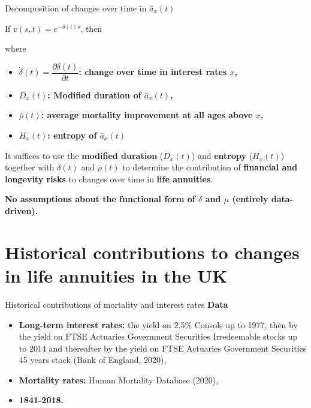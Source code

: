 \documentclass[10pt]{beamer}
\begin{document}
\begin{frame}{Decomposition of changes over time in $\bar{a}_x(t)$}


If $v(s,t)=e^{-\delta(t)s}$, then 


\begin{center}
	\pause
\end{center}

where

\begin{itemize}
	
	\item $\dot{\delta}(t)=\dfrac{\partial \delta(t)}{\partial t}$\textbf{: change over time in interest rates $x$,} \pause
	\item ${D}_x(t)$\textbf{: Modified duration of $\bar{a}_x(t)$,}	\pause
	\item $\bar{\rho}(t)$\textbf{: average mortality improvement at all ages above $x$,} 
	\item ${H}_x(t)$\textbf{: entropy of $\bar{a}_x(t)$} \pause
\end{itemize}

It suffices to use the \textbf{modified duration} ($D_x(t)$) and \textbf{entropy} (${H}_x(t)$) together with $\dot{\delta}(t)$ and $\bar{\rho}(t)$ to determine the contribution of \textbf{financial and longevity risks} to changes over time in \textbf{life annuities}. \pause

\textbf{No assumptions about the functional form of $\delta$ and $\mu$ (entirely data-driven).}
\end{frame}







\section{Historical contributions to changes in life annuities in the UK}


\begin{frame}{Historical contributions of mortality and interest rates}
\textbf{Data}
\begin{itemize}
	\item \textbf{Long-term interest rates:} the yield on 2.5\% Consols up to 1977, then by the yield on FTSE Actuaries Government Securities Irredeemable stocks up to 2014 and thereafter by the yield on FTSE Actuaries Government Securities 45 years stock (Bank of England, 2020), \pause
	\item \textbf{Mortality rates: } Human Mortality Database (2020), \pause
	\item \textbf{1841-2018.}
\end{itemize}


\end{frame}
\end{document}
